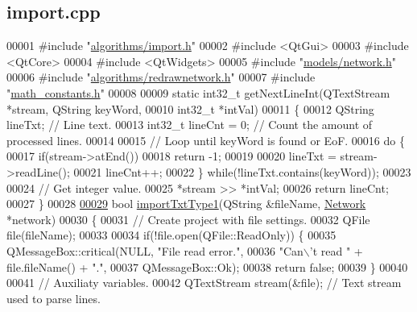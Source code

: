 \hypertarget{import_8cpp_source}{}\subsection{import.\+cpp}
\label{import_8cpp_source}

\begin{DoxyCode}
00001 \textcolor{preprocessor}{#include "\hyperlink{import_8h}{algorithms/import.h}"}
00002 \textcolor{preprocessor}{#include <QtGui>}
00003 \textcolor{preprocessor}{#include <QtCore>}
00004 \textcolor{preprocessor}{#include <QtWidgets>}
00005 \textcolor{preprocessor}{#include "\hyperlink{network_8h}{models/network.h}"}
00006 \textcolor{preprocessor}{#include "\hyperlink{redrawnetwork_8h}{algorithms/redrawnetwork.h}"}
00007 \textcolor{preprocessor}{#include "\hyperlink{math__constants_8h}{math\_constants.h}"}
00008 
00009 \textcolor{keyword}{static} int32\_t getNextLineInt(QTextStream *stream, QString keyWord,
00010                               int32\_t *intVal)
00011 \{
00012   QString lineTxt; \textcolor{comment}{// Line text.}
00013   int32\_t lineCnt = 0; \textcolor{comment}{// Count the amount of processed lines.}
00014 
00015   \textcolor{comment}{// Loop until keyWord is found or EoF.}
00016   \textcolor{keywordflow}{do} \{
00017     \textcolor{keywordflow}{if}(stream->atEnd())
00018       \textcolor{keywordflow}{return} -1;
00019 
00020     lineTxt = stream->readLine();
00021     lineCnt++;
00022   \} \textcolor{keywordflow}{while}(!lineTxt.contains(keyWord));
00023 
00024   \textcolor{comment}{// Get integer value.}
00025   *stream >> *intVal;
00026   \textcolor{keywordflow}{return} lineCnt;
00027 \}
00028 
\hypertarget{import_8cpp_source_l00029}{}\hyperlink{import_8h_ab30ac380d5e14f830ebc8eb839fbbdf0}{00029} \textcolor{keywordtype}{bool} \hyperlink{import_8cpp_ab30ac380d5e14f830ebc8eb839fbbdf0}{importTxtType1}(QString &fileName, \hyperlink{class_network}{Network} *network)
00030 \{
00031   \textcolor{comment}{// Create project with file settings.}
00032   QFile file(fileName);
00033 
00034   \textcolor{keywordflow}{if}(!file.open(QFile::ReadOnly)) \{
00035     QMessageBox::critical(NULL, \textcolor{stringliteral}{"File read error."},
00036                           \textcolor{stringliteral}{"Can\(\backslash\)'t read "} + file.fileName() + \textcolor{stringliteral}{"."},
00037                           QMessageBox::Ok);
00038     \textcolor{keywordflow}{return} \textcolor{keyword}{false};
00039   \}
00040 
00041   \textcolor{comment}{// Auxiliaty variables.}
00042   QTextStream stream(&file); \textcolor{comment}{// Text stream used to parse lines.}

\end{DoxyCode}

